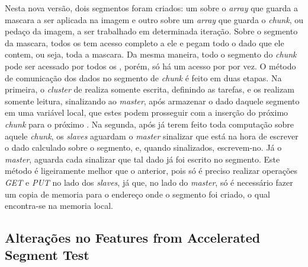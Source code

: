 \documentclass[a4paper,11pt]{article}
\begin{document}
Nesta nova versão, dois segmentos foram criados: um sobre o \textit{array} que guarda a mascara a ser aplicada na imagem e outro sobre um \textit{array} que guarda o \textit{chunk}, ou pedaço da imagem, a ser trabalhado em determinada iteração. Sobre o segmento da mascara, todos os \ccs tem acesso completo a ele e pegam todo o dado que ele contem, ou seja, toda a mascara. Da mesma maneira, todo o segmento do \textit{chunk} pode ser acessado por todos os \ccs, porém, só há um acesso por \cc por vez. O método de comunicação dos dados no segmento de \textit{chunk} é feito em duas etapas. Na primeira, o \textit{cluster} de \io realiza somente escrita, definindo as tarefas, e os \ccs realizam somente leitura, sinalizando ao \textit{master}, após armazenar o dado daquele segmento em uma variável local, que estes podem prosseguir com a inserção do próximo \textit{chunk} para o próximo \cc. Na segunda, após já terem feito toda computação sobre aquele \textit{chunk}, os \textit{slaves} aguardam o \textit{master} sinalizar que está na hora de escrever o dado calculado sobre o segmento, e, quando sinalizados, escrevem-no. Já o \textit{master}, aguarda cada \cc sinalizar que tal dado já foi escrito no segmento. Este método é ligeiramente melhor que o anterior, pois só é preciso realizar operações \textit{GET} e \textit{PUT} no lado dos \textit{slaves}, já que, no lado do \textit{master}, só é necessário fazer um copia de memoria para o endereço onde o segmento foi criado, o qual encontra-se na memoria local.

\subsection{Alterações no Features from Accelerated Segment Test}
\end{document}
